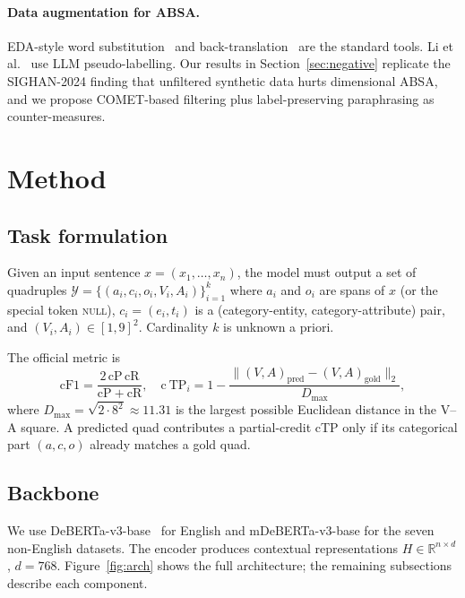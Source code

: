 \documentclass[runningheads]{llncs}
\begin{document}
\paragraph{Data augmentation for ABSA.}
EDA-style word substitution~\cite{wei2019eda} and
back-translation~\cite{sennrich2016bt} are the standard tools.
Li et al.~\cite{li2024llmabsa} use LLM pseudo-labelling.
Our results in Section~\ref{sec:negative} replicate the SIGHAN-2024
finding that unfiltered synthetic data hurts dimensional ABSA, and we
propose COMET-based filtering plus label-preserving paraphrasing as
counter-measures.

\section{Method}
\label{sec:method}

\subsection{Task formulation}
\label{sec:method:task}

Given an input sentence $x = (x_1, \dots, x_n)$, the model must output
a set of quadruples $\mathcal{Y}=\{(a_i, c_i, o_i, V_i, A_i)\}_{i=1}^k$
where $a_i$ and $o_i$ are spans of $x$ (or the special token
\textsc{null}), $c_i = (e_i, t_i)$ is a (category-entity,
category-attribute) pair, and $(V_i,A_i)\in[1,9]^2$. Cardinality $k$
is unknown a priori.

The official metric is
\begin{equation}
\mathrm{cF1} = \frac{2\, \mathrm{cP}\, \mathrm{cR}}{\mathrm{cP}+\mathrm{cR}},
\quad
\mathrm{c\!\:TP}_i = 1 - \frac{\| (V,A)_{\text{pred}} - (V,A)_{\text{gold}} \|_2}{D_{\max}},
\label{eq:cf1}
\end{equation}
where $D_{\max}=\sqrt{2\cdot 8^2}\!\approx\!11.31$ is the largest
possible Euclidean distance in the V--A square. A predicted quad
contributes a partial-credit cTP only if its categorical part
$(a, c, o)$ already matches a gold quad.

\subsection{Backbone}
\label{sec:method:backbone}

We use DeBERTa-v3-base~\cite{he2023deberta} for English and
mDeBERTa-v3-base for the seven non-English datasets. The encoder
produces contextual representations $H \in \mathbb{R}^{n\times d}$,
$d=768$. Figure~\ref{fig:arch} shows the full architecture; the
remaining subsections describe each component.
\end{document}
